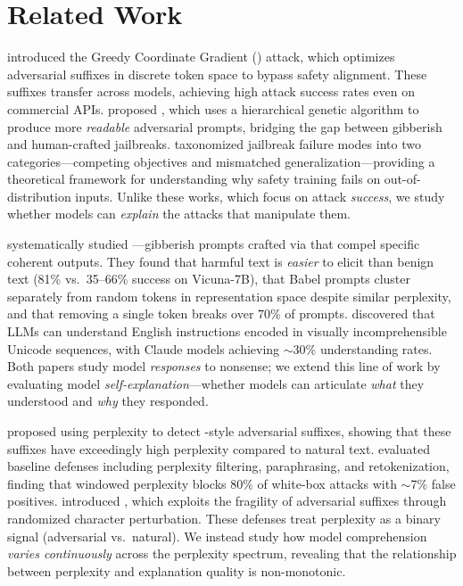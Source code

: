 \section{Related Work}
\label{sec:related}

\citet{zou2023universal} introduced the Greedy Coordinate Gradient (\gcg) attack, which optimizes adversarial suffixes in discrete token space to bypass safety alignment. These suffixes transfer across models, achieving high attack success rates even on commercial APIs. \citet{zhu2023autodan} proposed \autodan, which uses a hierarchical genetic algorithm to produce more \emph{readable} adversarial prompts, bridging the gap between \gcg gibberish and human-crafted jailbreaks. \citet{wei2023jailbroken} taxonomized jailbreak failure modes into two categories---competing objectives and mismatched generalization---providing a theoretical framework for understanding why safety training fails on out-of-distribution inputs. Unlike these works, which focus on attack \emph{success}, we study whether models can \emph{explain} the attacks that manipulate them.

\citet{cherepanova2024talking} systematically studied \babel---gibberish prompts crafted via \gcg that compel specific coherent outputs. They found that harmful text is \emph{easier} to elicit than benign text (81\% vs.\ 35--66\% success on Vicuna-7B), that Babel prompts cluster separately from random tokens in representation space despite similar perplexity, and that removing a single token breaks over 70\% of prompts. \citet{erziev2025sens} discovered that LLMs can understand English instructions encoded in visually incomprehensible Unicode sequences, with Claude models achieving $\sim$30\% understanding rates. Both papers study model \emph{responses} to nonsense; we extend this line of work by evaluating model \emph{self-explanation}---whether models can articulate \emph{what} they understood and \emph{why} they responded.

\citet{alon2023detecting} proposed using \gpttwo perplexity to detect \gcg-style adversarial suffixes, showing that these suffixes have exceedingly high perplexity compared to natural text. \citet{jain2023baseline} evaluated baseline defenses including perplexity filtering, paraphrasing, and retokenization, finding that windowed perplexity blocks 80\% of white-box attacks with $\sim$7\% false positives. \citet{robey2023smoothllm} introduced \smoothllm, which exploits the fragility of adversarial suffixes through randomized character perturbation. These defenses treat perplexity as a binary signal (adversarial vs.\ natural). We instead study how model comprehension \emph{varies continuously} across the perplexity spectrum, revealing that the relationship between perplexity and explanation quality is non-monotonic.


